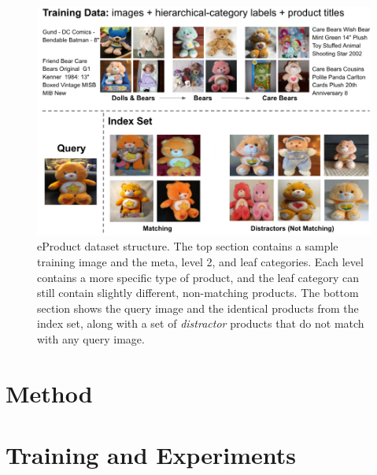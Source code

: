 \documentclass[conference]{IEEEtran}
\begin{document}
\begin{figure}[!t]
\centering
\includegraphics[scale=0.25]{structure}
\caption{eProduct dataset structure. The top section contains a sample training image and the meta,
level 2, and leaf categories. Each level contains a more specific type of product, and the leaf category
can still contain slightly different, non-matching products. 
The bottom section shows the query image and the identical products from the index set, along with a set 
of \emph{distractor} products that do not match with any query image.}

\label{fig:structure}
\end{figure}

\section{Method}
\section{Training and Experiments}
 \printbibliography
\end{document}
